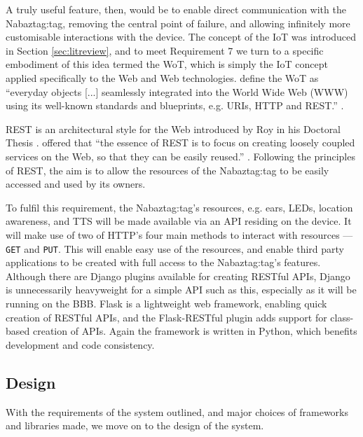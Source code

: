 \documentclass[12pt, a4paper]{article}
\begin{document}
A truly useful feature, then, would be to enable direct communication with the Nabaztag:tag, removing the central point of failure, and allowing infinitely more customisable interactions with the device. The concept of the \ac{IoT} was introduced in Section \ref{sec:litreview}, and to meet Requirement 7 we turn to a specific embodiment of this idea termed the \ac{WoT}, which is simply the \ac{IoT} concept applied specifically to the Web and Web technologies. \citeauthor{Gupta2011} define the \ac{WoT} as ``everyday objects [...] seamlessly integrated into the World Wide Web (WWW) using its well-known standards and blueprints, e.g. URIs, HTTP and REST.'' \parencite{Gupta2011}.

\ac{REST} is an architectural style for the Web introduced by Roy \citeauthor{Fielding2000} in his Doctoral Thesis \parencite{Fielding2000}. \citeauthor{Guinard2011} offered that ``the essence of REST is to focus on creating loosely coupled services on the Web, so that they can be easily reused.'' \parencite{Guinard2011}. Following the principles of \ac{REST}, the aim is to allow the resources of the Nabaztag:tag to be easily accessed and used by its owners.

To fulfil this requirement, the Nabaztag:tag's resources, e.g. ears, \acp{LED}, location awareness, and \ac{TTS} will be made available via an \ac{API} residing on the device. It will make use of two of \ac{HTTP}'s four main methods to interact with resources --- \verb+GET+ and \verb+PUT+. This will enable easy use of the resources, and enable third party applications to be created with full access to the Nabaztag:tag's features. Although there are Django plugins available for creating \ac{REST}ful \acp{API}, Django is unnecessarily heavyweight for a simple \ac{API} such as this, especially as it will be running on the \ac{BBB}. Flask \parencite{flask} is a lightweight web framework, enabling quick creation of \ac{REST}ful \acp{API}, and the Flask-\ac{REST}ful plugin \parencite{flaskrestful} adds support for class-based creation of \acp{API}. Again the framework is written in Python, which benefits development and code consistency.

	\subsection{Design}

	With the requirements of the system outlined, and major choices of frameworks and libraries made, we move on to the design of the system.	
	
\end{document}
